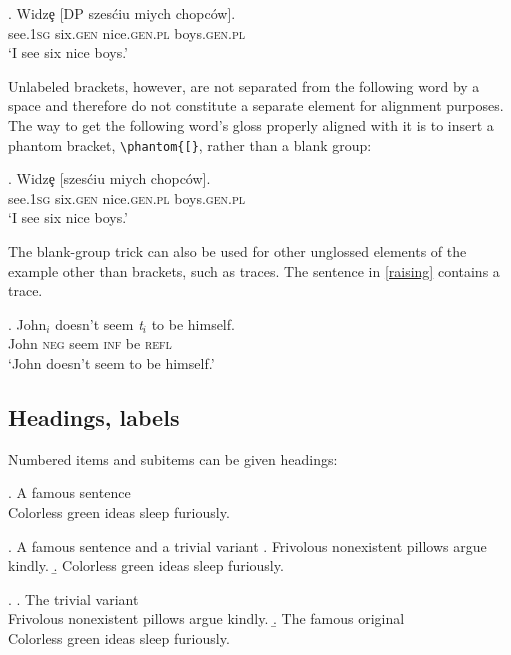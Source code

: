 \documentclass[letterpaper,12pt, twoside]{article}
\begin{document}
\exig. Widz\c{e}  [DP szes\'ciu {mi\textltilde ych} {ch\textltilde opc\'ow}]. \\ 
see.\textsc{1sg} six.\textsc{gen} nice.\textsc{gen.pl} boys.\textsc{gen.pl} \\
 `I see six nice boys.' 

Unlabeled brackets, however, are not separated from the following word by a space and therefore  do not constitute a separate element for alignment purposes. The way to get the following word's gloss  properly aligned with it is to insert a phantom bracket, \verb|\phantom{[}|, rather than a blank group:

\exg. 
Widz\c{e}  [szes\'ciu {mi\textltilde ych} {ch\textltilde opc\'ow}]. \\ 
see.\textsc{1sg} \phantom{[}six.\textsc{gen} nice.\textsc{gen.pl} boys.\textsc{gen.pl} \\ 
 `I see six nice boys.' 


The blank-group trick can also be used for other unglossed elements of the example other than brackets, such as traces. The sentence in \ref{raising} contains a trace.

\exg. John$_i$ doesn't seem \emph{t}$_i$ to be himself. \\
John	\textsc{neg} seem {} \textsc{inf} be \textsc{refl} \\
`John doesn't seem to be himself.' \label{raising}


%


\subsection{Headings, labels}

Numbered items and subitems can be given headings:

\ex.  A famous sentence\\
Colorless green ideas sleep furiously. 

\ex. A famous sentence and a trivial variant
\a. Frivolous nonexistent pillows argue kindly.
\b. Colorless green ideas sleep furiously.

\ex. 
\a. The trivial variant\\Frivolous nonexistent pillows argue kindly.
\b. The famous original\\Colorless green ideas sleep furiously.
\end{document}
